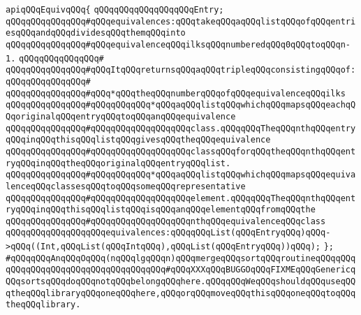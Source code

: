 \newline
\verb|apiqQQqEquivqQQq{|\newline
\newline
\verb|qQQqqQQqqQQqqQQqqQQqEntry;|\newline
\newline
\verb|qQQqqQQqqQQqqQQq#qQQqequivalences:qQQqtakeqQQqaqQQqlistqQQqofqQQqentriesqQQqandqQQqdividesqQQqthemqQQqinto|\newline
\verb|qQQqqQQqqQQqqQQq#qQQqequivalenceqQQqilksqQQqnumberedqQQq0qQQqtoqQQqn-1.|\newline
\verb|qQQqqQQqqQQqqQQq#|\newline
\verb|qQQqqQQqqQQqqQQq#qQQqItqQQqreturnsqQQqaqQQqtripleqQQqconsistingqQQqof:|\newline
\verb|qQQqqQQqqQQqqQQq#|\newline
\verb|qQQqqQQqqQQqqQQq#qQQq*qQQqtheqQQqnumberqQQqofqQQqequivalenceqQQqilks|\newline
\verb|qQQqqQQqqQQqqQQq#qQQqqQQqqQQq*qQQqaqQQqlistqQQqwhichqQQqmapsqQQqeachqQQqoriginalqQQqentryqQQqtoqQQqanqQQqequivalence|\newline
\verb|qQQqqQQqqQQqqQQq#qQQqqQQqqQQqqQQqqQQqclass.qQQqqQQqTheqQQqnthqQQqentryqQQqinqQQqthisqQQqlistqQQqgivesqQQqtheqQQqequivalence|\newline
\verb|qQQqqQQqqQQqqQQq#qQQqqQQqqQQqqQQqqQQqclassqQQqforqQQqtheqQQqnthqQQqentryqQQqinqQQqtheqQQqoriginalqQQqentryqQQqlist.|\newline
\verb|qQQqqQQqqQQqqQQq#qQQqqQQqqQQq*qQQqaqQQqlistqQQqwhichqQQqmapsqQQqequivalenceqQQqclassesqQQqtoqQQqsomeqQQqrepresentative|\newline
\verb|qQQqqQQqqQQqqQQq#qQQqqQQqqQQqqQQqqQQqelement.qQQqqQQqTheqQQqnthqQQqentryqQQqinqQQqthisqQQqlistqQQqisqQQqanqQQqelementqQQqfromqQQqthe|\newline
\verb|qQQqqQQqqQQqqQQq#qQQqqQQqqQQqqQQqqQQqnthqQQqequivalenceqQQqclass|\newline
\newline
\newline
\verb|qQQqqQQqqQQqqQQqqQQqequivalences:qQQqqQQqList(qQQqEntryqQQq)qQQq->qQQq((Int,qQQqList(qQQqIntqQQq),qQQqList(qQQqEntryqQQq))qQQq);|\newline
\verb|};|\newline
\newline
\verb|#qQQqqQQqAnqQQqOqQQq(nqQQqlgqQQqn)qQQqmergeqQQqsortqQQqroutineqQQqqQQqqQQqqQQqqQQqqQQqqQQqqQQqqQQqqQQq#qQQqXXXqQQqBUGGOqQQqFIXMEqQQqGenericqQQqsortsqQQqdoqQQqnotqQQqbelongqQQqhere.qQQqqQQqWeqQQqshouldqQQquseqQQqtheqQQqlibraryqQQqoneqQQqhere,qQQqorqQQqmoveqQQqthisqQQqoneqQQqtoqQQqtheqQQqlibrary.|\newline
